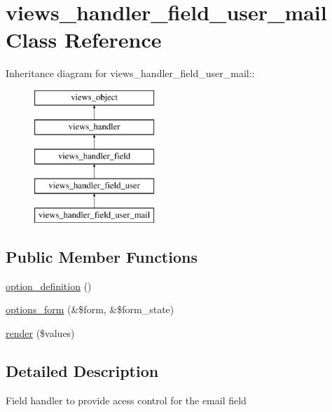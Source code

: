 \hypertarget{classviews__handler__field__user__mail}{
\section{views\_\-handler\_\-field\_\-user\_\-mail Class Reference}
\label{classviews__handler__field__user__mail}
}
Inheritance diagram for views\_\-handler\_\-field\_\-user\_\-mail::\begin{figure}[H]
\begin{center}
\leavevmode
\includegraphics[height=5cm]{classviews__handler__field__user__mail}
\end{center}
\end{figure}
\subsection*{Public Member Functions}
\begin{CompactItemize}
\item 
\hyperlink{classviews__handler__field__user__mail_747c64da5c9bdbd55c7a8908779db5a1}{option\_\-definition} ()
\item 
\hyperlink{classviews__handler__field__user__mail_ee55735f96178173853dbf1f8b293216}{options\_\-form} (\&\$form, \&\$form\_\-state)
\item 
\hyperlink{classviews__handler__field__user__mail_ab8c63fe4d09cff576f4588838dc363c}{render} (\$values)
\end{CompactItemize}


\subsection{Detailed Description}
Field handler to provide acess control for the email field 

